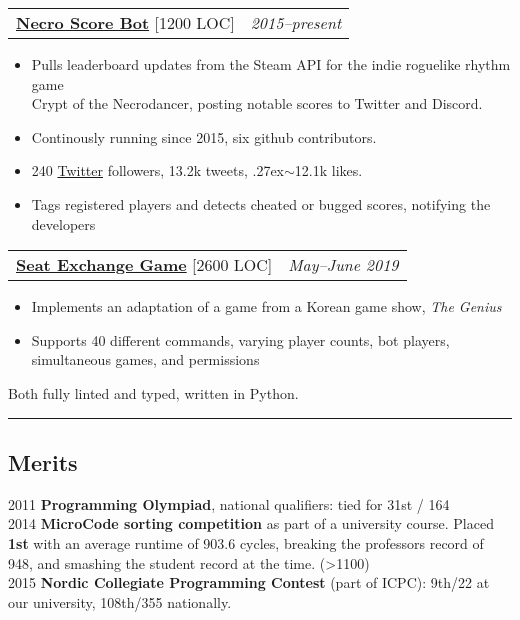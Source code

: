 \documentclass[10pt,letterpaper]{article}
\makeatletter
\newcommand{\headerrow}[2]
{\begin{tabular*}{\linewidth}{l@{\extracolsep{\fill}}r}
    #1 &
    #2 \\
\end{tabular*}}
\makeatother
\begin{document}
\headerrow
{\href{https://github.com/jakkdl/necro\_score\_bot}{\textbf{Necro Score Bot}} [1200 LOC]}
{\emph{2015--present}}
\begin{itemize}[noitemsep, topsep=1pt]
    \item Pulls leaderboard updates from the Steam API for the indie roguelike
        rhythm game \\ Crypt of the Necrodancer, posting notable scores
        to Twitter and Discord.
    \item Continously running since 2015, six github contributors.
    \item 240 \href{(https://twitter.com/necro\_score\_bot}{Twitter} followers, 13.2k tweets, {\raise.27ex\hbox{$\scriptstyle\sim$}}12.1k likes.
    \item Tags registered players and detects cheated or bugged scores, notifying the
        developers
\end{itemize}
\vspace{0.3em}
\headerrow
    {\href{https://github.com/jakkdl/seat\_exchange}{\textbf{Seat Exchange Game}} [2600 LOC]}
    {\emph{May--June 2019}}
\begin{itemize}[noitemsep, topsep=1pt]
    \item Implements an adaptation of a game from a Korean game show, \emph{The
        Genius}
    \item Supports 40 different commands, varying player counts,
        bot players, simultaneous games, and permissions
\end{itemize}
\vspace{0.2em}
Both fully linted and typed, written in Python. \\


\hrule
\vspace{-0.4em}
\subsection*{Merits}

2011 \textbf{Programming Olympiad}, national qualifiers: tied for 31st / 164 \\
2014 \textbf{MicroCode sorting competition} as part of a university course. Placed \textbf{1st} with an average runtime of 903.6 cycles, breaking the professors record of 948, and smashing the student record at the time. (>1100) \\
2015 \textbf{Nordic Collegiate Programming Contest} (part of ICPC): 9th/22 at our university, 108th/355 nationally.
\vspace{0.5em}
\end{document}
